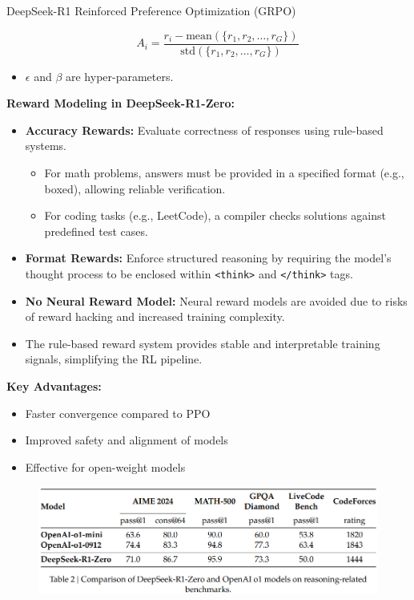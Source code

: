 \begin{frame}[allowframebreaks]{DeepSeek-R1 Reinforced Preference Optimization (GRPO)}
\begin{itemize}
\begin{equation}
            A_i = \frac{r_i - \text{mean}(\{r_1, r_2, \ldots, r_G\})}{\text{std}(\{r_1, r_2, \ldots, r_G\})}
        \end{equation}
        \item $\epsilon$ and $\beta$ are hyper-parameters.
    \end{itemize}
\framebreak
    \textbf{Reward Modeling in DeepSeek-R1-Zero:}
    \begin{itemize}
        \item \textbf{Accuracy Rewards:} Evaluate correctness of responses using rule-based systems.
        \begin{itemize}
            \item For math problems, answers must be provided in a specified format (e.g., boxed), allowing reliable verification.
            \item For coding tasks (e.g., LeetCode), a compiler checks solutions against predefined test cases.
        \end{itemize}
        \item \textbf{Format Rewards:} Enforce structured reasoning by requiring the model's thought process to be enclosed within \texttt{<think>} and \texttt{</think>} tags.
        \item \textbf{No Neural Reward Model:} Neural reward models are avoided due to risks of reward hacking and increased training complexity.
        \item The rule-based reward system provides stable and interpretable training signals, simplifying the RL pipeline.
    \end{itemize}
\framebreak
    \textbf{Key Advantages:}
    \begin{itemize}
        \item Faster convergence compared to PPO
        \item Improved safety and alignment of models
        \item Effective for open-weight models
    \end{itemize}
\framebreak
    \begin{figure}
        \centering
        \includegraphics[height=0.88\textheight,width=1.05\textwidth,keepaspectratio]{images/recent-advance/grpo-performance.png}

\end{figure}
\end{frame}
